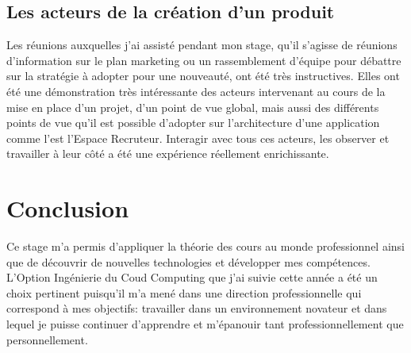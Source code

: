 \subsection{Les acteurs de la création d'un produit}
\label{sub:Les acteurs de la création d'un produit}
Les réunions auxquelles j'ai assisté pendant mon stage, qu'il s'agisse de réunions d'information sur le plan marketing ou un rassemblement d'équipe pour débattre sur la stratégie à adopter pour une nouveauté, ont été très instructives.
Elles ont été une démonstration très intéressante des acteurs intervenant au cours de la mise en place d'un projet, d'un point de vue global, mais aussi des différents points de vue qu'il est possible d'adopter sur l'architecture d'une application comme l'est l'Espace Recruteur.
Interagir avec tous ces acteurs, les observer et travailler à leur côté a été une expérience réellement enrichissante.

\section{Conclusion}
Ce stage m'a permis d'appliquer la théorie des cours au monde professionnel ainsi que de découvrir de nouvelles technologies et développer mes compétences.
L'Option Ingénierie du Coud Computing que j'ai suivie cette année a été un choix pertinent puisqu'il m'a mené dans une direction professionnelle qui correspond à mes objectifs: travailler dans un environnement novateur et dans lequel je puisse continuer d'apprendre et m'épanouir tant professionnellement que personnellement.
